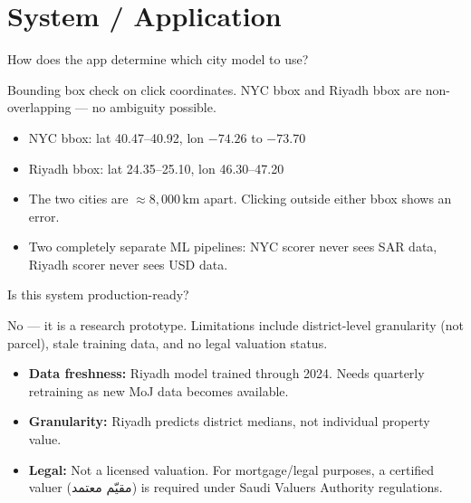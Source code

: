\documentclass[11pt, a4paper, twoside]{article}
\begin{document}
\section{System / Application}
\label{sec:system}

\begin{question}{How does the app determine which city model to use?}
\begin{shortanswer}
Bounding box check on click coordinates. NYC bbox and Riyadh bbox are
non-overlapping --- no ambiguity possible.
\end{shortanswer}

\begin{detail}
\begin{itemize}
  \item NYC bbox: lat 40.47--40.92, lon $-74.26$ to $-73.70$
  \item Riyadh bbox: lat 24.35--25.10, lon 46.30--47.20
  \item The two cities are $\approx 8{,}000\,\text{km}$ apart. Clicking
        outside either bbox shows an error.
  \item Two completely separate ML pipelines: NYC scorer never sees SAR data,
        Riyadh scorer never sees USD data.
\end{itemize}
\end{detail}
\end{question}

\bigskip

\begin{question}{Is this system production-ready?}
\begin{shortanswer}
No --- it is a research prototype. Limitations include district-level
granularity (not parcel), stale training data, and no legal valuation status.
\end{shortanswer}

\begin{detail}
\begin{itemize}
  \item \textbf{Data freshness:} Riyadh model trained through 2024. Needs
        quarterly retraining as new MoJ data becomes available.
  \item \textbf{Granularity:} Riyadh predicts district medians, not individual
        property value.
  \item \textbf{Legal:} Not a licensed valuation. For mortgage/legal purposes, a
        certified valuer (\textarabic{مقيّم معتمد}) is required under Saudi
        Valuers Authority regulations.
\end{itemize}
\end{detail}
\end{question}
\end{document}
